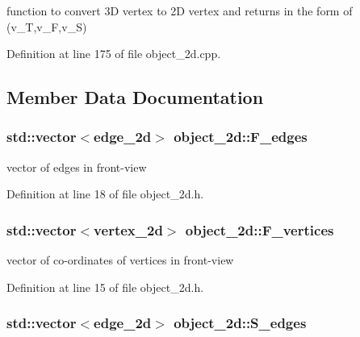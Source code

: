 function to convert 3D vertex to 2D vertex and returns in the form of (v\+\_\+T,v\+\_\+F,v\+\_\+S) 



Definition at line 175 of file object\+\_\+2d.\+cpp.



\subsection{Member Data Documentation}
\subsubsection[{\texorpdfstring{F\+\_\+edges}{F_edges}}]{\setlength{\rightskip}{0pt plus 5cm}std\+::vector$<${\bf edge\+\_\+2d}$>$ object\+\_\+2d\+::\+F\+\_\+edges}\hypertarget{classobject__2d_abb23f1e7a00cef6deba5d997ff40a751}{}\label{classobject__2d_abb23f1e7a00cef6deba5d997ff40a751}


vector of edges in front-\/view 



Definition at line 18 of file object\+\_\+2d.\+h.

\subsubsection[{\texorpdfstring{F\+\_\+vertices}{F_vertices}}]{\setlength{\rightskip}{0pt plus 5cm}std\+::vector$<${\bf vertex\+\_\+2d}$>$ object\+\_\+2d\+::\+F\+\_\+vertices}\hypertarget{classobject__2d_aa12b4ac9f646748a83b22c7a81ff1b7c}{}\label{classobject__2d_aa12b4ac9f646748a83b22c7a81ff1b7c}


vector of co-\/ordinates of vertices in front-\/view 



Definition at line 15 of file object\+\_\+2d.\+h.

\subsubsection[{\texorpdfstring{S\+\_\+edges}{S_edges}}]{\setlength{\rightskip}{0pt plus 5cm}std\+::vector$<${\bf edge\+\_\+2d}$>$ object\+\_\+2d\+::\+S\+\_\+edges}\hypertarget{classobject__2d_ad13cc39539ebc9c5634ae59dea81e33c}{}\label{classobject__2d_ad13cc39539ebc9c5634ae59dea81e33c}


